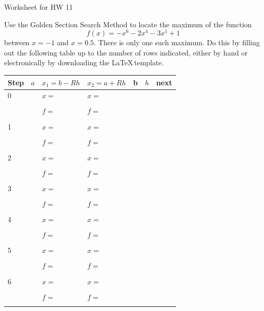 \documentclass[11pt,letterpaper]{article}
\begin{document}
	\begin{center}
		\Large{Worksheet for HW 11} \\ 
	\end{center}
	\normalsize

\noindent Use the Golden Section Search Method to locate the maximum of the function $$f(x) = -x^6 - 2 x^4 - 3 x^1 + 1$$ between $x=-1$ and $x=0.5$. There is only one such maximum. Do this by filling out the following table up to the number of rows indicated, either by hand or electronically by downloading the \LaTeX \,template.
\vspace{10mm}

\begin{tabular}{l|p{1.8cm}|p{3.5cm}|p{3.5cm}|p{1.8cm}|p{2cm}|p{1.5cm}}
Step & $a$ & $x_1 = b - Rh$ & $x_2 = a + Rh$ & b & $h$ & next\\ \hline 
0 &  & $x =$  &$x =$  &  & \phantom{1.2345}  & \\  
  &  &  &  &  &  & \\
   &  & $f =$ &$f=$  &  &  & \\ 
    &  &  &  &  &  & \\ \hline
1     &  &$x =$   &$x =$  &  &  & \\  
  &  &  &  &  &  & \\ 
   &  & $f =$ &$f =$  &  &  & \\ 
    &  &  &  &  &  & \\ \hline
2     &  &$x =$   &$x =$   &  &  & \\  
  &  &  &  &  &  & \\ 
   &  & $f =$ &$f =$  &  &  & \\ 
    &  &  &  &  &  & \\ \hline
3     &  &$x =$   &$x =$  &  &  & \\  
  &  &  &  &  &  & \\ 
   &  &$f =$  &$f =$   &  &  & \\ 
    &  &  &  &  &  & \\ \hline
4     &  &$x =$   &$x =$  &  &  & \\  
  &  &  &  &  &  & \\ 
   &  &$f =$  &$f =$   &  &  & \\ 
    &  &  &  &  &  & \\ \hline
5     &  &$x =$   &$x =$  &  &  & \\  
  &  &  &  &  &  & \\ 
   &  &$f =$  & $f =$ &  &  & \\ 
    &  &  &  &  &  & \\ \hline
6     &  &$x =$   &$x =$   &  &  & \\  
  &  &  &  &  &  & \\ 
   &  &$f =$  &$f =$  &  &  & \\ 
     &  &  &  &  &  & \\ 
\end{tabular}
\end{document}
